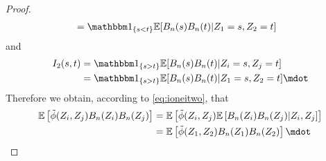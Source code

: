 \begin{lemma}
\begin{proof}
\begin{align*}
			&= \I{s<t} \E[B_n(s)B_n(t)|Z_1=s, Z_2=t]
		\end{align*}
		and 
		\begin{align*}
			I_2(s,t) &= \I{s>t} \E[B_n(s)B_n(t)|Z_i=s, Z_j=t]\\
			&= \I{s>t} \E[B_n(s)B_n(t)|Z_1=s, Z_2=t]\mdot
		\end{align*}
		Therefore we obtain, according to \eqref{eq:ioneitwo}, that 
		\begin{align*}
			\E\left[\tilde{\phi}(Z_{i},Z_{j}) B_n(Z_{i}) B_n(Z_{j})\right] &= \E\left[\tilde{\phi}(Z_{i},Z_{j}) \E\left[B_n(Z_{i}) B_n(Z_{j})| Z_i,Z_j\right]\right]\\
			&= \E\left[\tilde{\phi}(Z_{1},Z_{2}) B_n(Z_{1}) B_n(Z_{2})\right]\mdot
		\end{align*}
	\end{proof}
\end{lemma}
%
